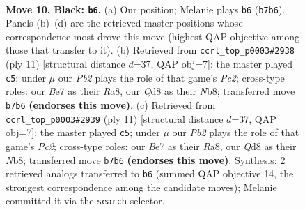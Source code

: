 \documentclass[11pt]{article}
\begin{document}
\clearpage

\begin{figure}[p]\centering
\begin{subfigure}{0.46\textwidth}\centering
\resizebox{\linewidth}{!}{%
\newchessgame
\chessboard[
  setfen={rnbq1rk1/pp2b1pp/2p2n2/3p1p2/3P4/1P2PNP1/P4PBP/RNBQR1K1 b - - 0 10},
  showmover=false,
  pgfstyle=straightmove, color=movearrow, markmove={b7-b6}
]}
\caption{}
\end{subfigure}\hfill
\begin{subfigure}{0.46\textwidth}\centering
\resizebox{\linewidth}{!}{%
\newchessgame
\chessboard[
  setfen={rnbq1rk1/ppp1bppp/4pn2/3p4/3P4/1P3NP1/P1P1PPBP/RNBQ1RK1 b - - 0 6},
  showmover=false,
  pgfstyle=straightmove, color=movearrow, markmove={c7-c5}
]}
\caption{}
\end{subfigure}
\\[4pt]
\begin{subfigure}{0.46\textwidth}\centering
\resizebox{\linewidth}{!}{%
\newchessgame
\chessboard[
  setfen={rnbq1rk1/ppp1bppp/4pn2/3p4/3P4/1P3NP1/P1P1PPBP/RNBQ1RK1 b - - 0 6},
  showmover=false,
  pgfstyle=straightmove, color=movearrow, markmove={c7-c5}
]}
\caption{}
\end{subfigure}\hfill

\caption{\textbf{Move 10, Black: \texttt{b6}.} (a) Our position; Melanie plays \texttt{b6} (\texttt{b7b6}). Panels (b)--(d) are the retrieved master positions whose correspondence most drove this move (highest QAP objective among those that transfer to it). (b) Retrieved from \texttt{ccrl\_top\_p0003\#2938} (ply 11) [structural distance $d$=37, QAP obj=7]: the master played \texttt{c5}; under $\mu$ our \emph{Pb2} plays the role of that game's \emph{Pc2}; cross-type roles: our \emph{B}e7 as their \emph{R}a8, our \emph{Q}d8 as their \emph{N}b8; transferred move \texttt{b7b6} \textbf{(endorses this move)}. (c) Retrieved from \texttt{ccrl\_top\_p0003\#2939} (ply 11) [structural distance $d$=37, QAP obj=7]: the master played \texttt{c5}; under $\mu$ our \emph{Pb2} plays the role of that game's \emph{Pc2}; cross-type roles: our \emph{B}e7 as their \emph{R}a8, our \emph{Q}d8 as their \emph{N}b8; transferred move \texttt{b7b6} \textbf{(endorses this move)}. Synthesis: 2 retrieved analogs transferred to \texttt{b6} (summed QAP objective 14, the strongest correspondence among the candidate moves); Melanie committed it via the \texttt{search} selector.}
\label{fig:thought-m19}
\end{figure}

\clearpage
\end{document}
